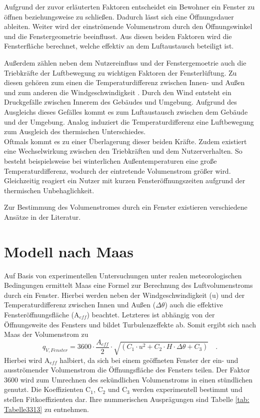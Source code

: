 Aufgrund der zuvor erläuterten Faktoren entscheidet ein Bewohner ein Fenster zu öffnen beziehungsweise zu schließen.
Dadurch lässt sich eine Öffnungsdauer ableiten.
Weiter wird der einströmende Volumenstrom durch den Öffnungswinkel und die Fenstergeometrie beeinflusst.
Aus diesen beiden Faktoren wird die Fensterfläche berechnet, welche effektiv an dem Luftaustausch beteiligt ist.\cite{Hall.2004}

Außerdem zählen neben dem Nutzereinfluss und der Fenstergemoetrie auch die Triebkräfte der Luftbewegung zu wichtigen Faktoren der Fensterlüftung.
Zu diesen gehören zum einen die Temperaturdifferenz zwischen Innen- und Außen und zum anderen die Windgeschwindigkeit \cite{Schild.2013b}.
Durch den Wind entsteht ein Druckgefälle zwischen Innerem des Gebäudes und Umgebung.
Aufgrund des Ausgleichs dieses Gefälles kommt es zum Luftaustausch zwischen dem Gebäude und der Umgebung.
Analog induziert die Temperaturdifferenz eine Luftbewegung zum Ausgleich des thermischen Unterschiedes. \cite{Maas.2017} \\
Oftmals kommt es zu einer Überlagerung dieser beiden Kräfte.
Zudem existiert eine Wechselwirkung zwischen den Triebkräften und dem Nutzerverhalten.
So besteht beispielsweise bei winterlichen Außentemperaturen eine große Temperaturdifferenz, wodurch der eintretende Volumenstrom größer wird.
Gleichzeitig reagiert ein Nutzer mit kurzen Fensteröffnungszeiten aufgrund der thermischen Unbehaglichkeit. 

Zur Bestimmung des Volumenstromes durch ein Fenster existieren verschiedene Ansätze in der Literatur.

\section*{Modell nach Maas}
Auf Basis von experimentellen Untersuchungen unter realen meteorologischen Bedingungen ermittelt Maas \cite{Maas.1995} eine Formel zur Berechnung des Luftvolumenstroms durch ein Fenster.
Hierbei werden neben der Windgeschwindigkeit (u) und der Temperaturdifferenz zwischen Innen und Außen (\(\Delta \theta\)) auch die effektive Fensteröffnungsfläche (A\(_{eff}\)) beachtet. 
Letzteres ist abhängig von der Öffnungsweite des Fensters und bildet Turbulenzeffekte ab.
Somit ergibt sich nach Maas der Volumenstrom zu
\begin{equation}
\label{eq:Gleichung3311}
q_{V, Fenster} = 3600 \cdot \frac{A_{eff}}{2} \cdot \sqrt{(C_1 \cdot u^2 + C_2 \cdot H \cdot \Delta \theta + C_3)} \quad \text{.}
\end{equation}
Hierbei wird A\(_{eff}\) halbiert, da sich bei einem geöffneten Fenster der ein- und ausströmender Volumenstrom die Öffnungsfläche des Fensters teilen.
Der Faktor 3600 wird zum Umrechnen des sekündlichen Volumenstroms in einen stündlichen genutzt.
Die Koeffizienten C\(_1\), C\(_2\) und C\(_3\) werden experimentell bestimmt und stellen Fitkoeffizienten dar.
Ihre nummerischen Ausprägungen sind Tabelle \ref{tab: Tabelle3313} zu entnehmen.

